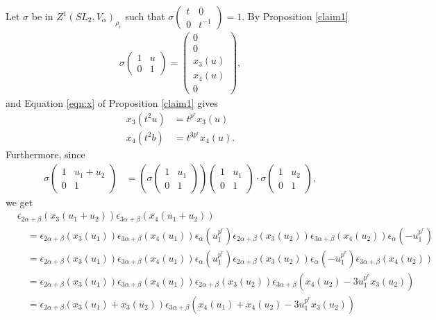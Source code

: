 	Let $\sigma$ be in $Z^1(SL_2, V_\alpha)_{\rho_r}$ such that $\sigma\left(\begin{matrix}t & 0\\0 & t^{-1}\end{matrix}\right) = 1$.
	By Proposition \ref{claim1}
	\begin{align*}
	\sigma\left(\begin{matrix} 1 & u \\ 0 & 1 \end{matrix}\right) =
	\left(\begin{matrix}
	0\\
	0\\
	x_3(u)\\
	x_4(u)\\
	0
	\end{matrix}\right),
	\end{align*}
and Equation \ref{eqn:x} of Proposition \ref{claim1} gives
\begin{align}
	x_3(t^2u) &= t^{p^r}x_3(u)\label{eqn:g2x3}\\
	x_4(t^2b) &= t^{3p^r}x_4(u)\label{eqn:g2x4}.
\end{align}
Furthermore, since
\begin{align*}
\sigma\left(\begin{matrix} 1 & u_1 + u_2 \\ 0 & 1\end{matrix}\right)
&= \left(\sigma\left(\begin{matrix} 1 & u_1 \\ 0 & 1\end{matrix}\right)\right)
\left(\begin{matrix} 1 & u_1 \\ 0 & 1\end{matrix}\right) \cdot
\sigma
\left(\begin{matrix} 1 & u_2 \\ 0 & 1\end{matrix}\right),
\end{align*}
we get
\begin{align*}
&\epsilon_{2\alpha+\beta}\left(x_3(u_1+u_2)\right)\epsilon_{3\alpha+\beta}\left(x_4(u_1+u_2)\right)
\\ &\quad	= \epsilon_{2\alpha+\beta}\left(x_3(u_1)\right)\epsilon_{3\alpha+\beta}\left(x_4(u_1)\right)
			\epsilon_\alpha(u_1^{p^r})
			\epsilon_{2\alpha+\beta}\left(x_3(u_2)\right)\epsilon_{3\alpha+\beta}\left(x_4(u_2)\right)
			\epsilon_\alpha(-u_1^{p^r})
\\ &\quad	= \epsilon_{2\alpha+\beta}\left(x_3(u_1)\right)\epsilon_{3\alpha+\beta}\left(x_4(u_1)\right)
			\epsilon_\alpha(u_1^{p^r})
			\epsilon_{2\alpha+\beta}\left(x_3(u_2)\right)
			\epsilon_\alpha(-u_1^{p^r})
			\epsilon_{3\alpha+\beta}\left(x_4(u_2)\right)
\\ &\quad	= \epsilon_{2\alpha+\beta}\left(x_3(u_1)\right)\epsilon_{3\alpha+\beta}\left(x_4(u_1)\right)
			\epsilon_{2\alpha+\beta}\left(x_3(u_2)\right)
			\epsilon_{3\alpha+\beta}\left(x_4(u_2) -3u_1^{p^r}x_3(u_2)\right)
\\ &\quad	= 
			\epsilon_{2\alpha+\beta}\left(x_3(u_1) + x_3(u_2)\right)
			\epsilon_{3\alpha+\beta}\left(x_4(u_1) + x_4(u_2) - 3u_1^{p^r}x_3(u_2)\right)
\end{align*}
